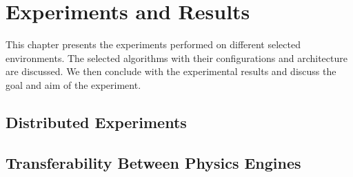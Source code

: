
\chapter{Experiments and Results}\label{chapter:experiments}

This chapter presents the experiments performed on different selected environments. The selected algorithms with their configurations and architecture are discussed. We then conclude with the experimental results and discuss the goal and aim of the experiment.

\section{Distributed Experiments}


\clearpage


\clearpage


\clearpage

% 

\section{Transferability Between Physics Engines}


\clearpage


\clearpage





